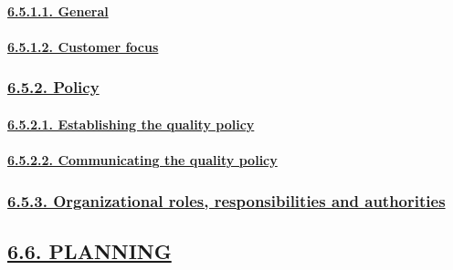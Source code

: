 \documentclass[
]{article}
\begin{document}
\hypertarget{general}{%
\paragraph{\texorpdfstring{\protect\hyperlink{general-9}{6.5.1.1.
General}}{6.5.1.1. General}}\label{general}}

\hypertarget{customer-focus}{%
\paragraph{\texorpdfstring{\protect\hyperlink{customer-focus-1}{6.5.1.2.
Customer focus}}{6.5.1.2. Customer focus}}\label{customer-focus}}

\hypertarget{policy}{%
\subsubsection{\texorpdfstring{\protect\hyperlink{policy-1}{6.5.2.
Policy}}{6.5.2. Policy}}\label{policy}}

\hypertarget{establishing-the-quality-policy}{%
\paragraph{\texorpdfstring{\protect\hyperlink{establishing-the-quality-policy-1}{6.5.2.1.
Establishing the quality
policy}}{6.5.2.1. Establishing the quality policy}}\label{establishing-the-quality-policy}}

\hypertarget{communicating-the-quality-policy}{%
\paragraph{\texorpdfstring{\protect\hyperlink{communicating-the-quality-policy-1}{6.5.2.2.
Communicating the quality
policy}}{6.5.2.2. Communicating the quality policy}}\label{communicating-the-quality-policy}}

\hypertarget{organizational-roles-responsibilities-and-authorities}{%
\subsubsection{\texorpdfstring{\protect\hyperlink{organizational-roles-responsibilities-and-authorities-1}{6.5.3.
Organizational roles, responsibilities and
authorities}}{6.5.3. Organizational roles, responsibilities and authorities}}\label{organizational-roles-responsibilities-and-authorities}}

\hypertarget{planning}{%
\subsection{\texorpdfstring{\protect\hyperlink{planning-1}{6.6.
PLANNING}}{6.6. PLANNING}}\label{planning}}
\end{document}
